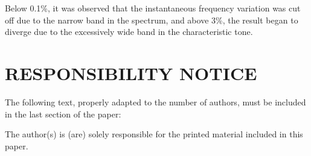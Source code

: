 \documentclass[10pt,fleqn,a4paper,twoside]{article}
\begin{document}
Below 0.1\%, it was observed that the instantaneous frequency variation was cut off due to the narrow band in the spectrum, and above 3\%, the result began to diverge due to the excessively wide band in the characteristic tone. 





\renewcommand{\refname}{}


\section{RESPONSIBILITY NOTICE}

The following text, properly adapted to the number of authors, must be included in the last section of the paper:

The author(s) is (are) solely responsible for the printed material included in this paper.
\end{document}
